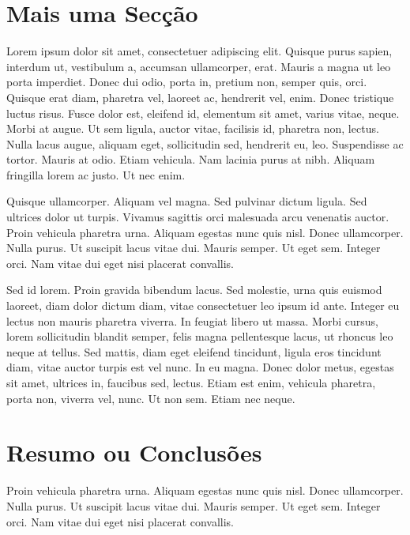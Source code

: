 \section{Mais uma Secção}

Lorem ipsum dolor sit amet, consectetuer adipiscing elit. Quisque
purus sapien, interdum ut, vestibulum a, accumsan ullamcorper,
erat. Mauris a magna ut leo porta imperdiet. Donec dui odio, porta in,
pretium non, semper quis, orci. Quisque erat diam, pharetra vel,
laoreet ac, hendrerit vel, enim. Donec tristique luctus risus. Fusce
dolor est, eleifend id, elementum sit amet, varius vitae, neque. Morbi
at augue. Ut sem ligula, auctor vitae, facilisis id, pharetra non,
lectus. Nulla lacus augue, aliquam eget, sollicitudin sed, hendrerit
eu, leo. Suspendisse ac tortor. Mauris at odio. Etiam vehicula. Nam
lacinia purus at nibh. Aliquam fringilla lorem ac justo. Ut nec
enim. 

Quisque ullamcorper. Aliquam vel magna. Sed pulvinar dictum
ligula. Sed ultrices dolor ut turpis. Vivamus sagittis orci malesuada
arcu venenatis auctor. Proin vehicula pharetra urna. Aliquam egestas
nunc quis nisl. Donec ullamcorper. Nulla purus. Ut suscipit lacus
vitae dui. Mauris semper. Ut eget sem. Integer orci. Nam vitae dui
eget nisi placerat convallis. 

Sed id lorem. Proin gravida bibendum lacus. Sed molestie, urna quis
euismod laoreet, diam dolor dictum diam, vitae consectetuer leo ipsum
id ante. Integer eu lectus non mauris pharetra viverra. In feugiat
libero ut massa. Morbi cursus, lorem sollicitudin blandit semper,
felis magna pellentesque lacus, ut rhoncus leo neque at tellus. Sed
mattis, diam eget eleifend tincidunt, ligula eros tincidunt diam,
vitae auctor turpis est vel nunc. In eu magna. Donec dolor metus,
egestas sit amet, ultrices in, faucibus sed, lectus. Etiam est enim,
vehicula pharetra, porta non, viverra vel, nunc. Ut non sem. Etiam nec
neque. 

\section{Resumo ou Conclusões}

Proin vehicula pharetra urna. Aliquam egestas
nunc quis nisl. Donec ullamcorper. Nulla purus. Ut suscipit lacus
vitae dui. Mauris semper. Ut eget sem. Integer orci. Nam vitae dui
eget nisi placerat convallis. 
